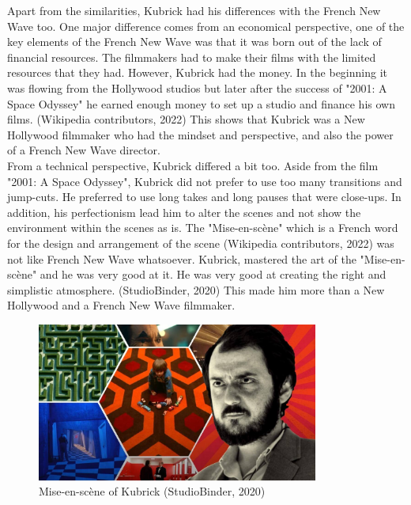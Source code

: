 \documentclass[12pt]{article}
\begin{document}
\par
Apart from the similarities, Kubrick had his differences with the French New Wave too.
One major difference comes from an economical perspective, one of the key elements of the French New Wave was that it was
born out of the lack of financial resources. The filmmakers had to make their films with the limited resources that they had.
However, Kubrick had the money. In the beginning it was flowing from the Hollywood studios but later after the success of
"2001: A Space Odyssey" he earned enough money to set up a studio and finance his own films. (Wikipedia contributors, 2022)
This shows that Kubrick was a New Hollywood filmmaker who had the mindset and perspective, and also the power of a French New Wave director.
\\
From a technical perspective, Kubrick differed a bit too. Aside from the film "2001: A Space Odyssey", Kubrick did not prefer to use
too many transitions and jump-cuts. He preferred to use long takes and long pauses that were close-ups.
In addition, his perfectionism lead him to alter the scenes and not show the environment within the scenes as is.
The "Mise-en-scène" which is a French word for the design and arrangement of the scene (Wikipedia contributors, 2022) was not like French New Wave whatsoever.
Kubrick, mastered the art of the "Mise-en-scène" and he was very good at it. He was very good at creating the right and simplistic atmosphere. (StudioBinder, 2020)
This made him more than a New Hollywood and a French New Wave filmmaker.
\\

\begin{figure}[h]
        \begin{center}
                \includegraphics[width=350px]{mizansen}
                \caption{Mise-en-scène of Kubrick (StudioBinder, 2020)}
        \end{center}
\end{figure}

\FloatBarrier
\end{document}
